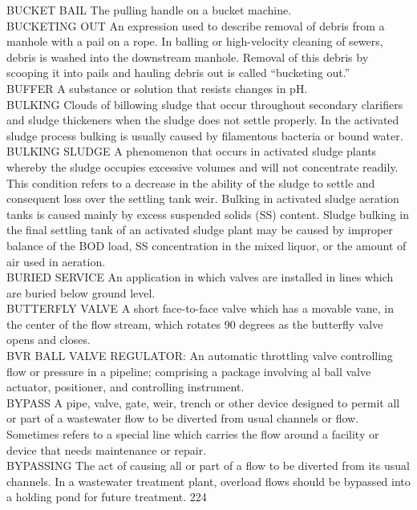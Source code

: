 \documentclass{article}
\begin{document}
BUCKET BAIL
The pulling handle on a bucket machine. 
\vspace{0.3cm}\\
BUCKETING OUT
An expression used to describe removal of debris from a manhole with a pail on a rope. In balling or high-velocity cleaning of sewers, debris is washed into the downstream manhole. Removal of this debris by scooping it into pails and hauling debris out is called “bucketing out.” 
\vspace{0.3cm}\\
BUFFER
A substance or solution that resists changes in pH. 
\vspace{0.3cm}\\
BULKING
Clouds of billowing sludge that occur throughout secondary clarifiers and sludge thickeners when the sludge does not settle properly.   In the activated sludge process bulking is usually caused by filamentous bacteria or bound water.
\vspace{0.3cm}\\
BULKING SLUDGE
A phenomenon that occurs in activated sludge plants whereby the sludge occupies excessive volumes and will not concentrate readily. This condition refers to a decrease in the ability of the sludge to settle and consequent loss over the settling tank weir. Bulking in activated sludge aeration tanks is caused mainly by excess suspended solids (SS) content. Sludge bulking in the final settling tank of an activated sludge plant may be caused by improper balance of the BOD load, SS concentration in the mixed liquor, or the amount of air used in aeration.
\vspace{0.3cm}\\
BURIED SERVICE
An application in which valves are installed in lines which are buried below ground level.
\vspace{0.3cm}\\
BUTTERFLY VALVE
A short face-to-face valve which has a movable vane, in the center of the flow stream, which rotates 90 degrees as the butterfly valve opens and closes.
\vspace{0.3cm}\\
BVR
BALL VALVE REGULATOR:  An automatic throttling valve controlling flow or pressure in a pipeline; comprising a package involving al ball valve actuator, positioner, and controlling instrument.
\vspace{0.3cm}\\
BYPASS
A pipe, valve, gate, weir, trench or other device designed to permit all or part of a wastewater flow to be diverted from usual channels or flow. Sometimes refers to a special line which carries the flow around a facility or device that needs maintenance or repair. 
\vspace{0.3cm}\\
BYPASSING
The act of causing all or part of a flow to be diverted from its usual channels. In a wastewater treatment plant, overload flows should be bypassed into a holding pond for future treatment. 224 
\vspace{0.3cm}\\
\end{document}
